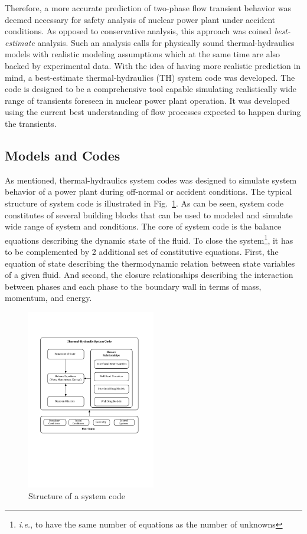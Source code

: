 \documentclass[11pt,titlepage]{article}
\begin{document}
Therefore, a more accurate prediction of two-phase flow transient behavior was deemed necessary for safety analysis of nuclear power plant under accident conditions.
As opposed to conservative analysis, this approach was coined \textit{best-estimate} analysis. 
Such an analysis calls for physically sound thermal-hydraulics models with realistic modeling assumptions which at the same time are also backed by experimental data.
With the idea of having more realistic prediction in mind, a best-estimate thermal-hydraulics (TH) system code was developed.
The code is designed to be a comprehensive tool capable simulating realistically wide range of transients foreseen in nuclear power plant operation.
It was developed using the current best understanding of flow processes expected to happen during the transients.
 
\subsection{Models and Codes}

As mentioned, thermal-hydraulics system codes was designed to simulate system behavior of a power plant during off-normal or accident conditions. 
The typical structure of system code is illustrated in Fig.~\ref{fig:systemCode}. 
As can be seen, system code constitutes of several building blocks that can be used to modeled and simulate wide range of system and conditions. 
The core of system code is the balance equations describing the dynamic state of the fluid.
To close the system\footnote{\textit{i.e.}, to have the same number of equations as the number of unknowns}, it has to be complemented by 2 additional set of constitutive equations. 
First, the equation of state describing the thermodynamic relation between state variables of a given fluid. 
And second, the closure relationships describing the interaction between phases and each phase to the boundary wall in terms of mass, momentum, and energy.  
\begin{figure}[htbp]
	\centering
	\includegraphics[width=0.50\textwidth]{SystemCode.pdf}
	\caption{Structure of a system code}
	\label{fig:systemCode}
\end{figure}
\end{document}
